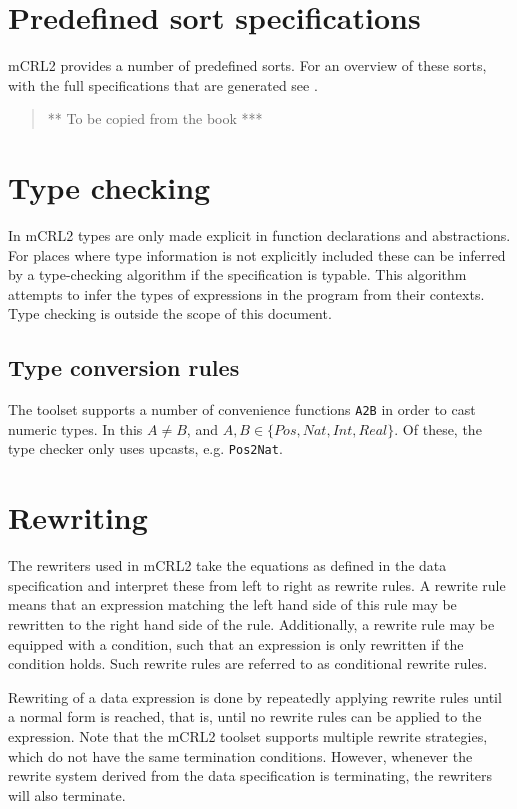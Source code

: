 \documentclass[a4paper,11pt]{article}
\newcommand{\comment}[1]{\begin{quotation} {\sf *** #1 ***} \end{quotation}}
\begin{document}
\section{Predefined sort specifications}\label{sec:predef_sorts}
mCRL2 provides a number of predefined sorts. For an overview of these sorts, with the full specifications that are generated see \cite[Appendix A]{groote07dubs}.
\comment{To be copied from the book}

\section{Type checking}
In mCRL2 types are only made explicit in function declarations and abstractions. For places where type information is not explicitly included these can be inferred by a type-checking algorithm if the specification is typable. This algorithm attempts to infer the types of expressions in the program from their contexts. Type checking is outside the scope of this document.

\subsection{Type conversion rules}
The toolset supports a number of convenience functions \texttt{A2B} in order to cast numeric types. In this $A \neq B$, and $A,B \in \{Pos, Nat, Int, Real \}$. Of these, the type checker only uses upcasts, e.g. \texttt{Pos2Nat}.

\section{Rewriting}
The rewriters used in mCRL2 \cite{weerdenburg2007} take the equations as defined in the data specification and interpret these from left to right as rewrite rules. A rewrite rule means that an expression matching the left hand side of this rule may be rewritten to the right hand side of the rule. Additionally, a rewrite rule may be equipped with a condition, such that an expression is only rewritten if the condition holds. Such rewrite rules are referred to as conditional rewrite rules.

Rewriting of a data expression is done by repeatedly applying rewrite rules until a normal form is reached, that is, until no rewrite rules can be applied to the expression. Note that the mCRL2 toolset supports multiple rewrite strategies, which do not have the same termination conditions. However, whenever the rewrite system derived from the data specification is terminating, the rewriters will also terminate.
\end{document}
